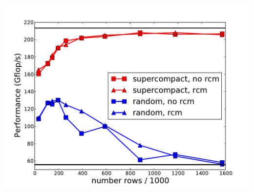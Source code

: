 \documentclass{beamer}
\begin{document}
\begin{frame}
\begin{columns}
    \includegraphics[width=\linewidth]{slides-figures/ICS-figures/random_supercompact.pdf}
  \end{columns}
\end{frame}
\end{document}
